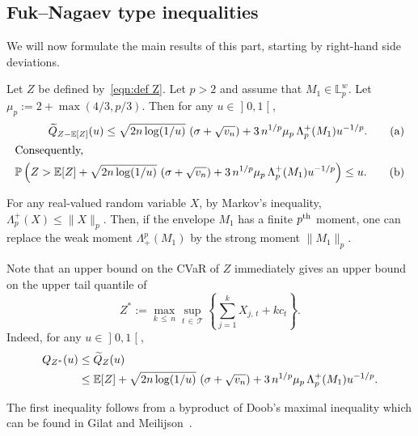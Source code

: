 \documentclass[AHL,Unicode,longabstracts,published]{cedram}
\newcommand{\bE}{\mathbb{E}}
\newcommand{\bL}{\mathbb{L}}
\newcommand{\bP}{\mathbb{P}}
\newcommand{\cT}{\mathcal{T}}
\newcommand{\intervalleoo}[2]{\mathopen{]} #1\mathclose{}\mathpunct{},#2\mathclose{[}}
\let\oldtilde\tilde
\renewcommand*{\tilde}[1]{\mathchoice{\widetilde{#1}}{\widetilde{#1}}{\oldtilde{#1}}{\oldtilde{#1}}}
\begin{document}
\subsection{Fuk--Nagaev type inequalities}

We will now formulate the main results of this part, starting by right-hand side deviations.

\begin{theo}\label{thm:FukNagaev from Rio right}
Let $Z$ be defined by~\eqref{eqn:def Z}. Let $p>2$ and assume that $M_1\in\bL_p^w$. Let $\mu_p:=2+\max(4/3, p/3)$. Then for any $u\in\intervalleoo 01$,
\begin{align}
\tilde Q_{Z-\bE[Z]}(u)\leq\sqrt{2n\log(1/u)}\,\left(\sigma+\sqrt{v_n}\right)+3\,n^{1/p}\mu_p\,\Lambda_p^+(M_1) u^{-1/p}. \tag{$\rm a$}\label{theo2.1.a}
\\
\intertext{Consequently,}
\bP\left(Z>\bE[Z]+\sqrt{2n\log(1/u)}\,\left(\sigma+\sqrt{v_n}\right)+3\,n^{1/p}\mu_p\,\Lambda_p^+(M_1) u^{-1/p}\right)\leq u. \tag{$\rm b$}\label{theo2.1.b}
\end{align}
\end{theo}

\begin{rema}
For any real-valued random variable $X$, by Markov's inequality, $\Lambda_p^+(X)\leq\|X\|_p$. Then, if the envelope $M_1$ has a finite $p^{\rm th}$ moment, one can replace the weak moment $\Lambda_+^p(M_1)$ by the strong moment $\|M_1\|_p$.
\end{rema}

\begin{rema}
Note that an upper bound on the CVaR of $Z$ immediately gives an upper bound on the upper tail quantile of
\begin{equation}
Z^*:=\max_{k\,\leq\,n}\sup_{t\,\in\,\cT}\left\{\sum_{j=1}^k X_{j,\,t}+kc_t\right\}.
\end{equation}
Indeed, for any $u\in\intervalleoo 01$,
\begin{equation}
\begin{aligned}
Q_{Z^*}(u)&\leq \tilde Q_{Z}(u)\\
&\leq \bE[Z]+ \sqrt{2n\log(1/u)}\,\left(\sigma+\sqrt{v_n}\right)+3\,n^{1/p}\mu_p\,\Lambda_p^+(M_1) u^{-1/p}.
\end{aligned}
\end{equation}

The first inequality follows from a byproduct of Doob's maximal inequality which can be found in Gilat and Meilijson~\cite{GM88}.
\end{rema}
\end{document}
